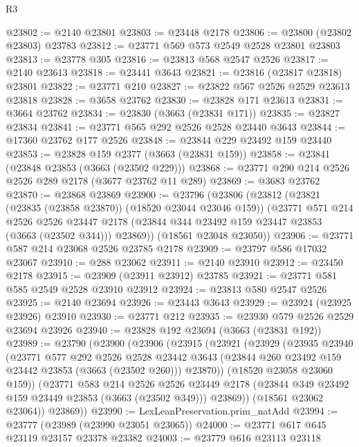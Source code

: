 \begin{lexlean}{R3}
\begin{coremodule}
@23802 := @2140 @23801
@23803 := @23448 @2178
@23806 := @23800 (@23802 @23803) @23783
@23812 := @23771 @569 @573 @2549 @2528 @23801 @23803
@23813 := @23778 @305
@23816 := @23813 @568 @2547 @2526
@23817 := @2140 @23613
@23818 := @23441 @3643
@23821 := @23816 (@23817 @23818) @23801
@23822 := @23771 @210
@23827 := @23822 @567 @2526 @2529 @23613 @23818
@23828 := @3658 @23762
@23830 := @23828 @171 @23613
@23831 := @3664 @23762
@23834 := @23830 (@3663 (@23831 @171))
@23835 := @23827 @23834
@23841 := @23771 @565 @292 @2526 @2528 @23440 @3643
@23844 := @17360 @23762 @177 @2526
@23848 := @23844 @229 @23492 @159 @23440
@23853 := @23828 @159 @2377 (@3663 (@23831 @159))
@23858 := @23841 (@23848 @23853 (@3663 (@23502 @229)))
@23868 := @23771 @290 @214 @2526 @2526 @289 @2178 (@3677 @23762 @11 @289)
@23869 := @3683 @23762
@23870 := @23868 @23869
@23900 := @23796
    (@23806
      (@23812
        (@23821 (@23835 (@23858 @23870)) (@18520 @23044 @23046 @159))
        (@23771
          @571
          @214
          @2526
          @2526
          @23447
          @2178
          (@23844 @344 @23492 @159 @23447 @23853 (@3663 (@23502 @344)))
          @23869))
      (@18561 @23048 @23050))
@23906 := @23771 @587 @214 @23068 @2526 @23785 @2178
@23909 := @23797 @586 @17032 @23067
@23910 := @288 @23062
@23911 := @2140 @23910
@23912 := @23450 @2178
@23915 := @23909 (@23911 @23912) @23785
@23921 := @23771 @581 @585 @2549 @2528 @23910 @23912
@23924 := @23813 @580 @2547 @2526
@23925 := @2140 @23694
@23926 := @23443 @3643
@23929 := @23924 (@23925 @23926) @23910
@23930 := @23771 @212
@23935 := @23930 @579 @2526 @2529 @23694 @23926
@23940 := @23828 @192 @23694 (@3663 (@23831 @192))
@23989 := @23790
    (@23900
      (@23906
        (@23915
          (@23921
            (@23929
              (@23935
                @23940
                (@23771
                  @577
                  @292
                  @2526
                  @2528
                  @23442
                  @3643
                  (@23844 @260 @23492 @159 @23442 @23853 (@3663 (@23502 @260)))
                  @23870))
              (@18520 @23058 @23060 @159))
            (@23771
              @583
              @214
              @2526
              @2526
              @23449
              @2178
              (@23844 @349 @23492 @159 @23449 @23853 (@3663 (@23502 @349)))
              @23869))
          (@18561 @23062 @23064))
        @23869))
@23990 := LexLeanPreservation.prim_natAdd
@23994 := @23777 (@23989 (@23990 @23051 @23065))
@24000 := @23771 @617 @645 @23119 @23157 @23378 @23382
@24003 := @23779 @616 @23113 @23118

\end{coremodule}
\end{lexlean}
